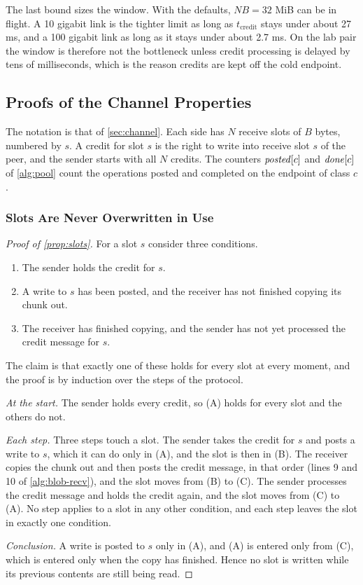 The last bound sizes the window. With the defaults, $N B = 32$ MiB can be in
flight. A 10 gigabit link is the tighter limit as long as $t_{\text{credit}}$
stays under about 27 ms, and a 100 gigabit link as long as it stays under
about 2.7 ms. On the
lab pair the window is therefore not the bottleneck unless credit processing
is delayed by tens of milliseconds, which is the reason credits are kept off
the cold endpoint.

\subsection{Proofs of the Channel Properties}
\label{sec:proofs-blob}

The notation is that of \cref{sec:channel}. Each side has $N$ receive slots of
$B$ bytes, numbered by $s$. A credit for slot $s$ is the right to write into
receive slot $s$ of the peer, and the sender starts with all $N$ credits. The
counters $\mathit{posted}[c]$ and $\mathit{done}[c]$ of \cref{alg:pool} count the
operations posted and completed on the endpoint of class $c$.

\subsubsection{Slots Are Never Overwritten in Use}

\begin{proof}[Proof of \cref{prop:slots}]
For a slot $s$ consider three conditions.
\begin{enumerate}
  \item[(A)] The sender holds the credit for $s$.
  \item[(B)] A write to $s$ has been posted, and the receiver has not finished
        copying its chunk out.
  \item[(C)] The receiver has finished copying, and the sender has not yet
        processed the credit message for $s$.
\end{enumerate}
The claim is that exactly one of these holds for every slot at every moment,
and the proof is by induction over the steps of the protocol.

\emph{At the start.} The sender holds every credit, so (A) holds for every
slot and the others do not.

\emph{Each step.} Three steps touch a slot. The sender takes the credit for
$s$ and posts a write to $s$, which it can do only in (A), and the slot is
then in (B). The receiver copies the chunk out and then posts the credit
message, in that order (lines 9 and 10 of \cref{alg:blob-recv}), and the slot
moves from (B) to (C). The sender processes the credit message and holds the
credit again, and the slot moves from (C) to (A). No step applies to a slot
in any other condition, and each step leaves the slot in exactly one
condition.

\emph{Conclusion.} A write is posted to $s$ only in (A), and (A) is entered
only from (C), which is entered only when the copy has finished. Hence no
slot is written while its previous contents are still being read.
\end{proof}

